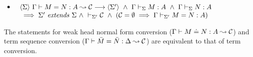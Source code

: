 \begin{theorem}
\begin{itemize}
	\item
	    $\begin{array}[t]{l}
		\langle {\Sigma} \rangle ~{{\Gamma} \vdash {M} = {N} : {A} \leadsto {\mathcal{C}}} \longrightarrow \langle {\Sigma'} \rangle
		~ \wedge ~ {\Gamma} \vdash_{\Sigma} {M} : {A}
		~ \wedge ~ {\Gamma} \vdash_{\Sigma} {N} : {A}
		\\
		{} \implies {\Sigma'} ~ \mathit{extends} ~ {\Sigma}
		~ \wedge ~ \vdash_{\Sigma'} {\mathcal{C}}
		~ \wedge ~ (\mathcal{C} = \emptyset \implies {\Gamma} \vdash_{\Sigma'}M=N:A)
	    \end{array}$

    \end{itemize}

    The statements for weak head normal form conversion (${\Gamma} \vdash {M} \doteq {N} : {A} \leadsto {\mathcal{C}}$) and term sequence conversion (${\Gamma} \vdash {\bar M} = {\bar N} : {\Delta} \leadsto {\mathcal{C}}$)
    are equivalent to that of term conversion.
\end{theorem}

